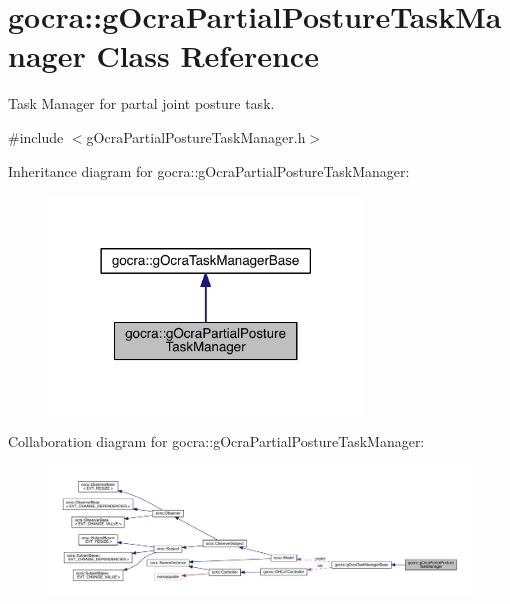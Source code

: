 \hypertarget{classgocra_1_1gOcraPartialPostureTaskManager}{}\section{gocra\+:\+:g\+Ocra\+Partial\+Posture\+Task\+Manager Class Reference}
\label{classgocra_1_1gOcraPartialPostureTaskManager}


Task Manager for partal joint posture task.  




{\ttfamily \#include $<$g\+Ocra\+Partial\+Posture\+Task\+Manager.\+h$>$}



Inheritance diagram for gocra\+:\+:g\+Ocra\+Partial\+Posture\+Task\+Manager\+:\nopagebreak
\begin{figure}[H]
\begin{center}
\leavevmode
\includegraphics[width=237pt]{d1/d79/classgocra_1_1gOcraPartialPostureTaskManager__inherit__graph}
\end{center}
\end{figure}


Collaboration diagram for gocra\+:\+:g\+Ocra\+Partial\+Posture\+Task\+Manager\+:
\nopagebreak
\begin{figure}[H]
\begin{center}
\leavevmode
\includegraphics[width=350pt]{de/d94/classgocra_1_1gOcraPartialPostureTaskManager__coll__graph}
\end{center}
\end{figure}
